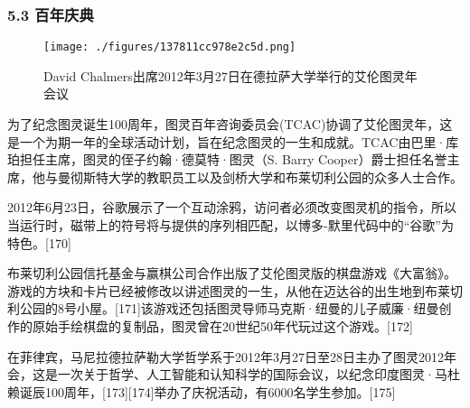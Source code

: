 \subsubsection{5.3 百年庆典}
\begin{figure}[ht]
\centering
\texttt{[image: ./figures/137811cc978e2c5d.png]}
\caption{David Chalmers出席2012年3月27日在德拉萨大学举行的艾伦图灵年会议} \label{fig_ALTL_12}
\end{figure}
为了纪念图灵诞生100周年，图灵百年咨询委员会(TCAC)协调了艾伦图灵年，这是一个为期一年的全球活动计划，旨在纪念图灵的一生和成就。TCAC由巴里·库珀担任主席，图灵的侄子约翰·德莫特·图灵（S. Barry Cooper）爵士担任名誉主席，他与曼彻斯特大学的教职员工以及剑桥大学和布莱切利公园的众多人士合作。

2012年6月23日，谷歌展示了一个互动涂鸦，访问者必须改变图灵机的指令，所以当运行时，磁带上的符号将与提供的序列相匹配，以博多-默里代码中的“谷歌”为特色。[170]

布莱切利公园信托基金与赢棋公司合作出版了艾伦图灵版的棋盘游戏《大富翁》。游戏的方块和卡片已经被修改以讲述图灵的一生，从他在迈达谷的出生地到布莱切利公园的8号小屋。[171]该游戏还包括图灵导师马克斯·纽曼的儿子威廉·纽曼创作的原始手绘棋盘的复制品，图灵曾在20世纪50年代玩过这个游戏。[172]

在菲律宾，马尼拉德拉萨勒大学哲学系于2012年3月27日至28日主办了图灵2012年会，这是一次关于哲学、人工智能和认知科学的国际会议，以纪念印度图灵·马杜赖诞辰100周年，[173][174]举办了庆祝活动，有6000名学生参加。[175]